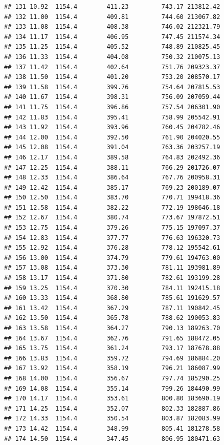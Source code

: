 \documentclass[]{article}
\begin{document}
\begin{verbatim}
## 131 10.92  1154.4        411.23         743.17 213812.42
## 132 11.00  1154.4        409.81         744.60 213067.82
## 133 11.08  1154.4        408.38         746.02 212321.79
## 134 11.17  1154.4        406.95         747.45 211574.34
## 135 11.25  1154.4        405.52         748.89 210825.45
## 136 11.33  1154.4        404.08         750.32 210075.13
## 137 11.42  1154.4        402.64         751.76 209323.37
## 138 11.50  1154.4        401.20         753.20 208570.17
## 139 11.58  1154.4        399.76         754.64 207815.53
## 140 11.67  1154.4        398.31         756.09 207059.44
## 141 11.75  1154.4        396.86         757.54 206301.90
## 142 11.83  1154.4        395.41         758.99 205542.91
## 143 11.92  1154.4        393.96         760.45 204782.46
## 144 12.00  1154.4        392.50         761.90 204020.55
## 145 12.08  1154.4        391.04         763.36 203257.19
## 146 12.17  1154.4        389.58         764.83 202492.36
## 147 12.25  1154.4        388.11         766.29 201726.07
## 148 12.33  1154.4        386.64         767.76 200958.31
## 149 12.42  1154.4        385.17         769.23 200189.07
## 150 12.50  1154.4        383.70         770.71 199418.36
## 151 12.58  1154.4        382.22         772.19 198646.18
## 152 12.67  1154.4        380.74         773.67 197872.51
## 153 12.75  1154.4        379.26         775.15 197097.37
## 154 12.83  1154.4        377.77         776.63 196320.73
## 155 12.92  1154.4        376.28         778.12 195542.61
## 156 13.00  1154.4        374.79         779.61 194763.00
## 157 13.08  1154.4        373.30         781.11 193981.89
## 158 13.17  1154.4        371.80         782.61 193199.28
## 159 13.25  1154.4        370.30         784.11 192415.18
## 160 13.33  1154.4        368.80         785.61 191629.57
## 161 13.42  1154.4        367.29         787.11 190842.45
## 162 13.50  1154.4        365.78         788.62 190053.83
## 163 13.58  1154.4        364.27         790.13 189263.70
## 164 13.67  1154.4        362.76         791.65 188472.05
## 165 13.75  1154.4        361.24         793.17 187678.88
## 166 13.83  1154.4        359.72         794.69 186884.20
## 167 13.92  1154.4        358.19         796.21 186087.99
## 168 14.00  1154.4        356.67         797.74 185290.25
## 169 14.08  1154.4        355.14         799.26 184490.99
## 170 14.17  1154.4        353.61         800.80 183690.19
## 171 14.25  1154.4        352.07         802.33 182887.86
## 172 14.33  1154.4        350.54         803.87 182083.99
## 173 14.42  1154.4        348.99         805.41 181278.58
## 174 14.50  1154.4        347.45         806.95 180471.63

\end{verbatim}
\end{document}
